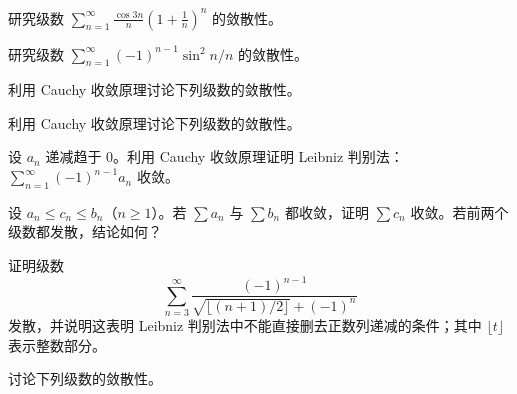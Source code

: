 \noindent\begin{minipage}{\textwidth}
研究级数 $\displaystyle\sum_{n=1}^{\infty}\frac{\cos3n}{n}\left(1+\frac1n\right)^n$ 的敛散性。
\end{minipage}\par\vfill
\noindent\begin{minipage}{\textwidth}
研究级数 $\sum_{n=1}^{\infty}(-1)^{n-1}\sin^2n/n$ 的敛散性。
\end{minipage}\par\vfill
\newpage
\noindent\begin{minipage}{\textwidth}
利用 Cauchy 收敛原理讨论下列级数的敛散性。
\end{minipage}\par\vfill
\noindent\begin{minipage}{\textwidth}
利用 Cauchy 收敛原理讨论下列级数的敛散性。
\end{minipage}\par\vfill
\noindent\begin{minipage}{\textwidth}
设 $a_n$ 递减趋于 $0$。利用 Cauchy 收敛原理证明 Leibniz 判别法：$\sum_{n=1}^{\infty}(-1)^{n-1}a_n$ 收敛。
\end{minipage}\par\vfill
\newpage
\noindent\begin{minipage}{\textwidth}
设 $a_n\le c_n\le b_n$（$n\ge1$）。若 $\sum a_n$ 与 $\sum b_n$ 都收敛，证明 $\sum c_n$ 收敛。若前两个级数都发散，结论如何？
\end{minipage}\par\vfill
\noindent\begin{minipage}{\textwidth}
证明级数\[\sum_{n=3}^{\infty}\frac{(-1)^{n-1}}{\sqrt{\lfloor(n+1)/2\rfloor}+(-1)^n}\]发散，并说明这表明 Leibniz 判别法中不能直接删去正数列递减的条件；其中 $\lfloor t\rfloor$ 表示整数部分。
\end{minipage}\par\vfill
\noindent\begin{minipage}{\textwidth}
讨论下列级数的敛散性。
\end{minipage}\par\vfill
